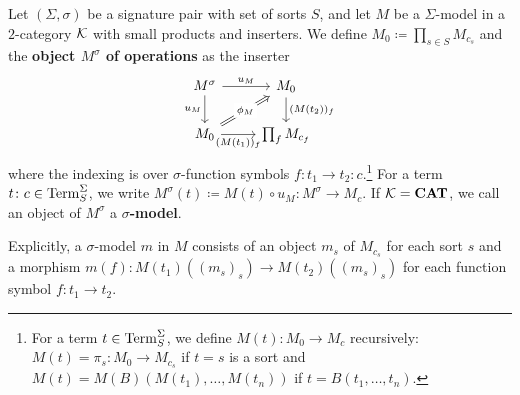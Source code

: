 \begin{definition}
   Let $(\Sigma,\sigma)$ be a signature pair with set of sorts $S$, and let $M$ be a $\Sigma$-model in a $2$-category $\mathcal{K}$ with small products and inserters. We define $M_0 \coloneqq \prod_{s \in S} M_{c_s}$ and the \textbf{object $M^\sigma$ of operations} as the inserter
   \[
   \begin{tikzcd}
M^\sigma \arrow[d, "u_M"'] \arrow[r, "u_M"]                                    & M_0 \arrow[d, "(M(t_2))_f"]            \\
M_0 \arrow[r, "(M(t_1))_f"'] \arrow[ru, "\phi_M" description, Rightarrow] & \prod_{f} M_{c_f}
\end{tikzcd}
   \]
   where the indexing is over $\sigma$-function symbols $f\colon t_1\to t_2\colon c$.\footnote{For a term $t\in\mathrm{Term}_S^\Sigma$, we define $M(t)\colon M_0\to M_c$ recursively: $M(t) = \pi_s\colon M_0\to M_{c_s}$ if $t = s$ is a sort and $M(t) = M(B)(M(t_1),\ldots, M(t_n))$ if $t = B(t_1,\ldots, t_n)$.} For a term $t\colon c\in \mathrm{Term}_S^\Sigma$, we write $M^\sigma(t) \coloneqq M(t)\circ u_M\colon M^\sigma\to M_c$. If $\mathcal{K} = \mathbf{CAT}$, we call an object of $M^\sigma$ a \textbf{$\sigma$-model}.
\end{definition}
Explicitly, a $\sigma$-model $m$ in $M$ consists of an object $m_s$ of $M_{c_s}$ for each sort $s$ and a morphism $m(f)\colon M(t_1)((m_s)_s)\to M(t_2)((m_s)_s)$ for each function symbol $f\colon t_1\to t_2$.

